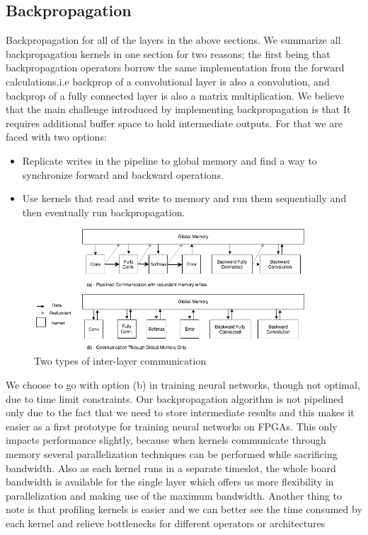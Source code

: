 \subsection{Backpropagation}

Backpropagation for all of the layers in the above sections. We summarize all backpropagation kernels in one section for two reasons; the first being that backpropagation operators borrow the same implementation from the forward calculations.i.e backprop of a convolutional layer is also a convolution, and backprop of a fully connected layer is also a matrix multiplication. We believe that the main challenge introduced by implementing backpropagation is that It requires additional buffer space to hold intermediate outputs. For that we are faced with two options:
\begin{itemize}
\item
Replicate writes in the pipeline to global memory and find a way to synchronize forward and backward operations.
\item
Use kernels that read and write to memory and run them sequentially and then eventually run backpropagation.
\end{itemize}

\begin{figure}[h]
\centering
\includegraphics[width=0.9\textwidth]{Figures/comm}
\caption[comm]{ Two types of inter-layer communication }
\label{fig:comm}
\end{figure}

We choose to go with option (b) in training neural networks, though not optimal, due to time limit constraints. Our backpropagation algorithm is not pipelined only due to the fact that we need to store intermediate results and this makes it easier as a first prototype for training neural networks on FPGAs. This only impacts performance slightly, because when kernels communicate through memory several parallelization techniques can be performed while sacrificing bandwidth. Also as each kernel runs in a separate timeslot, the whole board bandwidth is available for the single layer which offers us more flexibility in parallelization and making use of the maximum bandwidth. Another thing to note is that profiling kernels is easier and we can better see the time consumed by each kernel and relieve bottlenecks for different operators or architectures 

